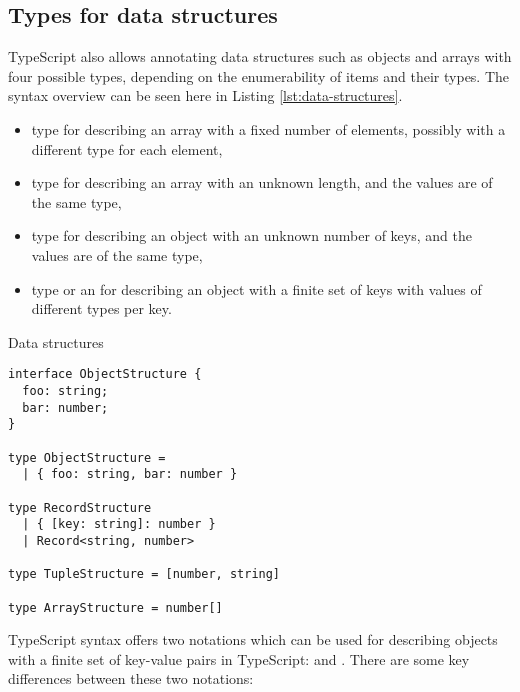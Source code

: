 \subsection{Types for data structures}

TypeScript also allows annotating data structures such as objects and arrays with four possible types, depending on the enumerability of items and their types. The syntax overview can be seen here in Listing \ref{lst:data-structures}.

\begin{itemize}
  \item {} type for describing an array with a fixed number of elements, possibly with a different type for each element,
  \item {} type for describing an array with an unknown length, and the values are of the same type,
  \item {} type for describing an object with an unknown number of keys, and the values are of the same type,
  \item {} type or an  for describing an object with a finite set of keys with values of different types per key.
\end{itemize}

\begin{listing}[ht]
  \caption{Data structures}\label{lst:data-structures}
  \begin{verbatim}
interface ObjectStructure {
  foo: string;
  bar: number;
}

type ObjectStructure =  
  | { foo: string, bar: number }

type RecordStructure 
  | { [key: string]: number }
  | Record<string, number>

type TupleStructure = [number, string]

type ArrayStructure = number[]
\end{verbatim}
\end{listing}

TypeScript syntax offers two notations which can be used for describing objects with a finite set of key-value pairs in TypeScript:  and . There are some key differences between these two notations:

